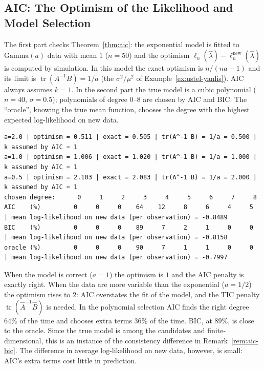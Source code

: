 \documentclass[main.tex]{subfiles}
\begin{document}
\subsection{AIC: The Optimism of the Likelihood and Model Selection}
The first part checks Theorem~\ref{thm:aic}: the exponential model is fitted to $\text{Gamma}(a)$ data with mean $1$ ($n=50$) and the optimism $\ell_n(\hat\lambda)-\ell_n^{\text{new}}(\hat\lambda)$ is computed by simulation. In this model the exact optimism is $n/(na-1)$ and its limit is $\operatorname{tr}(A^{-1}B)=1/a$ (the $\sigma^2/\mu^2$ of Example~\ref{ex:ustel-yanlis}). AIC always assumes $k=1$. In the second part the true model is a cubic polynomial ($n=40$, $\sigma=0.5$); polynomials of degree $0$--$8$ are chosen by AIC and BIC. The ``oracle'', knowing the true mean function, chooses the degree with the highest expected log-likelihood on new data.

\begin{lstlisting}[style=output]
a=2.0 | optimism = 0.511 | exact = 0.505 | tr(A^-1 B) = 1/a = 0.500 | k assumed by AIC = 1
a=1.0 | optimism = 1.006 | exact = 1.020 | tr(A^-1 B) = 1/a = 1.000 | k assumed by AIC = 1
a=0.5 | optimism = 2.103 | exact = 2.083 | tr(A^-1 B) = 1/a = 2.000 | k assumed by AIC = 1
chosen degree:      0     1     2     3     4     5     6     7     8
AIC    (%)         0     0     0    64    12     8     6     4     5   | mean log-likelihood on new data (per observation) = -0.8489
BIC    (%)         0     0     0    89     7     2     1     0     0   | mean log-likelihood on new data (per observation) = -0.8158
oracle (%)         0     0     0    90     7     1     1     0     0   | mean log-likelihood on new data (per observation) = -0.7997
\end{lstlisting}

When the model is correct ($a=1$) the optimism is $1$ and the AIC penalty is exactly right. When the data are more variable than the exponential ($a=1/2$) the optimism rises to $2$: AIC overstates the fit of the model, and the TIC penalty $\operatorname{tr}(\hat A^{-1}\hat B)$ is needed. In the polynomial selection AIC finds the right degree $64\%$ of the time and chooses extra terms $36\%$ of the time. BIC, at $89\%$, is close to the oracle. Since the true model is among the candidates and finite-dimensional, this is an instance of the consistency difference in Remark~\ref{rem:aic-bic}. The difference in average log-likelihood on new data, however, is small: AIC's extra terms cost little in prediction.
\end{document}

